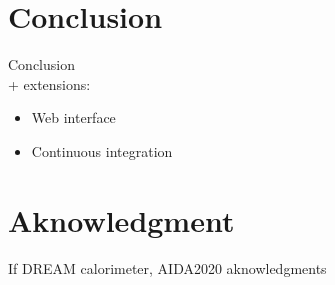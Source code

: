 \documentclass{webofc}
\begin{document}
\section{Conclusion}
\label{sec:conclusion}

Conclusion \\
+ extensions:

\begin{itemize}
  \item Web interface
  \item Continuous integration
\end{itemize}

\section{Aknowledgment}
\label{sec:conclusion}

If DREAM calorimeter, AIDA2020 aknowledgments
\end{document}
